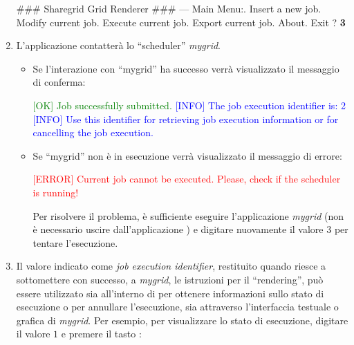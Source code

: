 \begin{enumerate}
\begin{mgCodeBox}
\small
\#\#\# Sharegrid Grid Renderer \#\#\#\newline
--- Main Menu:. Insert a new job. Modify current job. Execute current job. Export current job. About. Exit\newline
? \textbf{3}
\end{mgCodeBox}
\item L'applicazione \mgTheApp{} contatter\`a lo ``scheduler'' \emph{mygrid}.
\begin{itemize}
\item Se l'interazione con ``mygrid'' ha successo verr\`a visualizzato il messaggio di conferma:
\begin{mgCodeBox} 
\small
\textcolor{green}{[OK] Job successfully submitted.}\newline
\textcolor{blue}{[INFO] The job execution identifier is: 2}\newline
\textcolor{blue}{[INFO] Use this identifier for retrieving job\newline
execution information or for cancelling the job\newline
execution.}
\end{mgCodeBox} 
\item Se ``mygrid'' non \`e in esecuzione verr\`a visualizzato il messaggio di errore:
\begin{mgCodeBox}
\small
\textcolor{red}{[ERROR] Current job cannot be executed. Please, check if the scheduler is running!}
\end{mgCodeBox}
Per risolvere il problema, \`e sufficiente eseguire l'applicazione \emph{mygrid} (non \`e necessario uscire dall'applicazione \mgTheApp{}) e digitare nuovamente il valore $3$ per tentare l'esecuzione.
\end{itemize}
\item Il valore indicato come \emph{job execution identifier}, restituito quando \mgTheApp{} riesce a sottomettere con successo, a \emph{mygrid}, le istruzioni per il ``rendering'', pu\`o essere utilizzato sia all'interno di \mgTheApp{} per ottenere informazioni sullo stato di esecuzione o per annullare l'esecuzione, sia attraverso l'interfaccia testuale o grafica di \emph{mygrid}. Per esempio, per visualizzare lo stato di esecuzione, digitare il valore $1$ e premere il tasto :

\end{enumerate}
